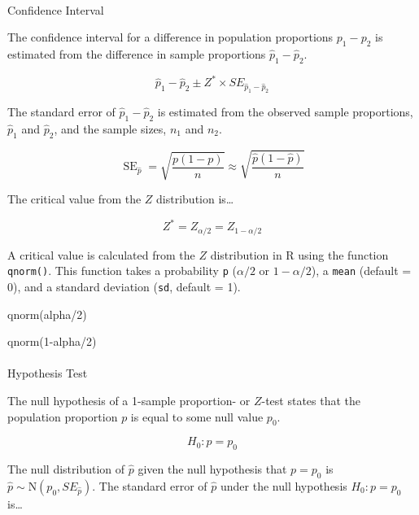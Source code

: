 \documentclass[
  letterpaper,
  DIV=11,
  numbers=noendperiod]{scrartcl}
\makeatletter
\let\oldparagraph\paragraph
\renewcommand{\paragraph}{
    \@ifstar
      \xxxParagraphStar
      \xxxParagraphNoStar
  }
\newcommand{\xxxParagraphStar}[1]{\oldparagraph*{#1}\mbox{}}
\newcommand{\xxxParagraphNoStar}[1]{\oldparagraph{#1}\mbox{}}
\newenvironment{Shaded}{\begin{snugshade}}{\end{snugshade}}
\newcommand{\DecValTok}[1]{\textcolor[rgb]{0.68,0.00,0.00}{#1}}
\newcommand{\FunctionTok}[1]{\textcolor[rgb]{0.28,0.35,0.67}{#1}}
\newcommand{\NormalTok}[1]{\textcolor[rgb]{0.00,0.23,0.31}{#1}}
\newcommand{\SpecialCharTok}[1]{\textcolor[rgb]{0.37,0.37,0.37}{#1}}
\makeatother
\begin{document}
\paragraph{Confidence Interval}\label{confidence-interval-4}

The confidence interval for a difference in population proportions
\(p_1-p_2\) is estimated from the difference in sample proportions
\(\hat{p}_1-\hat{p}_2\).

\[
\hat{p}_1-\hat{p}_2 \pm Z^* \times SE_{\hat{p}_1-\hat{p}_2}
\]

The standard error of \(\hat{p}_1-\hat{p}_2\) is estimated from the
observed sample proportions, \(\hat{p}_1\) and \(\hat{p}_2\), and the
sample sizes, \(n_1\) and \(n_2\).

\[
\operatorname{SE}_{\hat{p}}=\sqrt{\frac{p(1-p)}{n}}\approx\sqrt{\frac{\hat{p}(1-\hat{p})}{n}}
\]

The critical value from the \(Z\) distribution is\ldots{}

\[
Z^*=Z_{\alpha/2}=Z_{1-\alpha/2}
\]

A critical value is calculated from the \(Z\) distribution in R using
the function \texttt{qnorm()}. This function takes a probability
\texttt{p} (\(\alpha/2\) or \(1-\alpha/2\)), a \texttt{mean} (default =
0), and a standard deviation (\texttt{sd}, default = 1).

\begin{Shaded}
\begin{Highlighting}[]
\FunctionTok{qnorm}\NormalTok{(alpha}\SpecialCharTok{/}\DecValTok{2}\NormalTok{)}

\FunctionTok{qnorm}\NormalTok{(}\DecValTok{1}\SpecialCharTok{{-}}\NormalTok{alpha}\SpecialCharTok{/}\DecValTok{2}\NormalTok{)}
\end{Highlighting}
\end{Shaded}

\paragraph{Hypothesis Test}\label{hypothesis-test-4}

The null hypothesis of a 1-sample proportion- or \(Z\)-test states that
the population proportion \(p\) is equal to some null value \(p_0\).

\[
H_0 \colon p=p_0
\]

The null distribution of \(\hat{p}\) given the null hypothesis that
\(p=p_0\) is \(\hat{p} \sim \text{N}\left(p_0, SE_{\hat{p}}\right)\).
The standard error of \(\hat{p}\) under the null hypothesis
\(H_0 \colon p=p_0\) is\ldots{}
\end{document}
